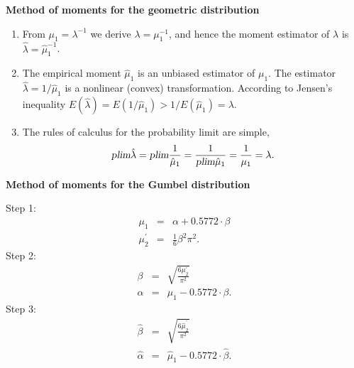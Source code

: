 \begin{Solution}{11.3}
\textbf{Method of moments for the geometric distribution}

\begin{enumerate}
\item From $\mu _{1}=\lambda ^{-1}$ we derive $\lambda =\mu _{1}^{-1}$, and
hence the moment estimator of $\lambda $ is $\hat{\lambda}=\hat{\mu}_{1}^{-1}
$.

\item The empirical moment $\hat{\mu}_{1}$ is an unbiased estimator of $\mu
_{1}$. The estimator $\hat{\lambda}=1/\hat{\mu}_{1}$ is a nonlinear (convex)
transformation. According to Jensen's inequality $E\left( \hat{\lambda}%
\right) =E(1/\hat{\mu}_{1})>1/E(\hat{\mu}_{1})=\lambda $.

\item The rules of calculus for the probability limit are simple,%
\begin{equation*}
\textsl{plim}\hat{\lambda}=\textsl{plim}\frac{1}{\hat{\mu}_{1}}=\frac{1}{%
\textsl{plim}\hat{\mu}_{1}}=\frac{1}{\mu _{1}}=\lambda .
\end{equation*}
\end{enumerate}
\end{Solution}
\begin{Solution}{11.4}
\textbf{Method of moments for the Gumbel distribution}

Step 1:%
\begin{eqnarray*}
\mu _{1} &=&\alpha +0.5772\cdot \beta  \\
\mu _{2}^{\prime } &=&\frac{1}{6}\beta ^{2}\pi ^{2}.
\end{eqnarray*}%
Step 2:%
\begin{eqnarray*}
\beta  &=&\sqrt{\frac{6\mu _{2}^{\prime }}{\pi ^{2}}} \\
\alpha  &=&\mu _{1}-0.5772\cdot \beta .
\end{eqnarray*}%
Step 3:%
\begin{eqnarray*}
\hat{\beta} &=&\sqrt{\frac{6\hat{\mu}_{2}^{\prime }}{\pi ^{2}}} \\
\hat{\alpha} &=&\hat{\mu}_{1}-0.5772\cdot \hat{\beta}.
\end{eqnarray*}
\end{Solution}
